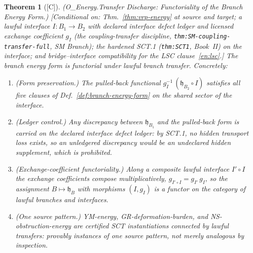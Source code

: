 \documentclass[12pt,oneside]{amsbook}
\theoremstyle{plain}
\newtheorem{theorem}{Theorem}[section]
\theoremstyle{definition}
\theoremstyle{remark}
\newcommand{\status}[1]{\textup{[#1]}}
\begin{document}
\begin{theorem}[\status{C}]\label{thm:vrp-energy-transfer}
\textup{(O\_Energy.Transfer Discharge: Functoriality of the Branch
Energy Form.)}
\textup{[Conditional on: Thm.~\ref{thm:vrp-energy} at source and
target; a lawful interface $I : B_1 \to B_2$ with declared
interface defect ledger and licensed exchange coefficient $g_I$
(the coupling-transfer discipline,
\texttt{thm:SM-coupling-transfer-full}, SM Branch); the hardened
SCT.1 (\texttt{thm:SCT1}, Book~II) on the interface; and
bridge--interface compatibility for the LSC clause~\ref{en:lsc}.]}
The branch energy form is functorial under lawful branch transfer.
Concretely:
\begin{enumerate}[label=\textup{(\arabic*)}]
  \item \emph{(Form preservation.)}  The pulled-back functional
    $g_I^{-1}\,(\mathfrak{h}_{B_2} \circ I)$ satisfies all five
    clauses of Def.~\ref{def:branch-energy-form} on the shared
    sector of the interface.
  \item \emph{(Ledger control.)}  Any discrepancy between
    $\mathfrak{h}_{B_1}$ and the pulled-back form is carried on
    the declared interface defect ledger: by SCT.1, no hidden
    transport loss exists, so an unledgered discrepancy would be
    an undeclared hidden supplement, which is prohibited.
  \item \emph{(Exchange-coefficient functoriality.)}  Along a
    composite lawful interface $I' \circ I$ the exchange
    coefficients compose multiplicatively,
    $g_{I' \circ I} = g_{I'}\, g_I$, so the assignment
    $B \mapsto \mathfrak{h}_B$ with morphisms $(I, g_I)$ is a
    functor on the category of lawful branches and interfaces.
  \item \emph{(One source pattern.)}  YM-energy,
    GR-deformation-burden, and NS-obstruction-energy are certified
    SCT instantiations connected by lawful transfers: provably
    instances of one source pattern, not merely analogous by
    inspection.
\end{enumerate}
\end{theorem}
\end{document}
